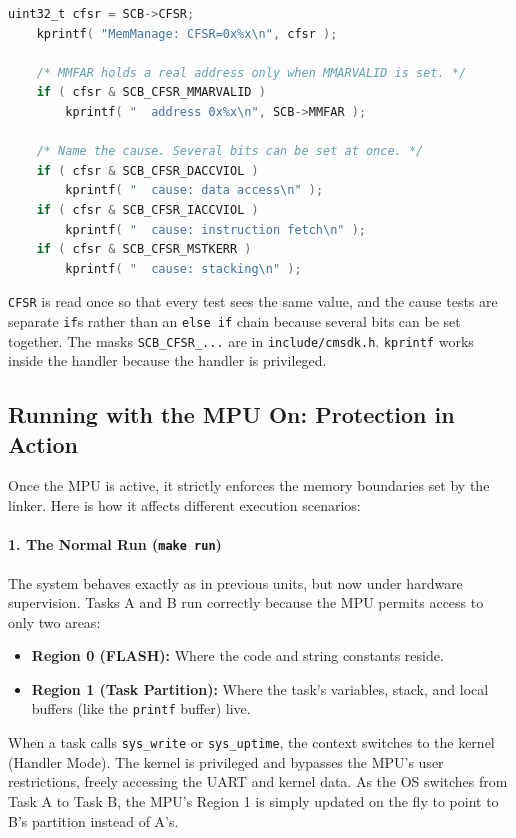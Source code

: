 \begin{lstlisting}[language=C]
    uint32_t cfsr = SCB->CFSR;
    kprintf( "MemManage: CFSR=0x%x\n", cfsr );

    /* MMFAR holds a real address only when MMARVALID is set. */
    if ( cfsr & SCB_CFSR_MMARVALID )
        kprintf( "  address 0x%x\n", SCB->MMFAR );

    /* Name the cause. Several bits can be set at once. */
    if ( cfsr & SCB_CFSR_DACCVIOL )
        kprintf( "  cause: data access\n" );
    if ( cfsr & SCB_CFSR_IACCVIOL )
        kprintf( "  cause: instruction fetch\n" );
    if ( cfsr & SCB_CFSR_MSTKERR )
        kprintf( "  cause: stacking\n" );
\end{lstlisting}

\texttt{CFSR} is read once so that every test sees the same value, and the cause tests are separate \texttt{if}s rather than an \texttt{else if} chain because several bits can be set together. The masks \texttt{SCB\_CFSR\_...} are in \texttt{include/cmsdk.h}. \texttt{kprintf} works inside the handler because the handler is privileged.

\subsection{Running with the MPU On: Protection in Action}

Once the MPU is active, it strictly enforces the memory boundaries set by the linker. Here is how it affects different execution scenarios:

\paragraph*{1. The Normal Run (\texttt{make run})}
The system behaves exactly as in previous units, but now under hardware supervision. Tasks A and B run correctly because the MPU permits access to only two areas:
\begin{itemize}
    \item \textbf{Region 0 (FLASH):} Where the code and string constants reside.
    \item \textbf{Region 1 (Task Partition):} Where the task's variables, stack, and local buffers (like the \texttt{printf} buffer) live. 
\end{itemize}
When a task calls \texttt{sys\_write} or \texttt{sys\_uptime}, the context switches to the kernel (Handler Mode). The kernel is privileged and bypasses the MPU's user restrictions, freely accessing the UART and kernel data. As the OS switches from Task A to Task B, the MPU's Region 1 is simply updated on the fly to point to B's partition instead of A's.

